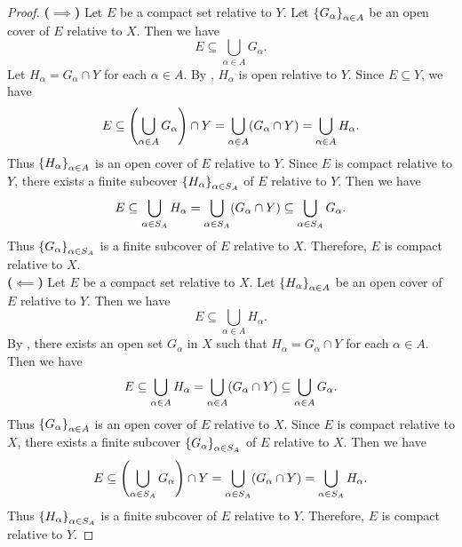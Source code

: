 \begin{proof}
    \textbf{($\implies$)} Let $E$ be a compact set relative to $Y$. Let
    $\set*{G_{\alpha}}_{\alpha \in A}$ be an open cover of $E$ relative to $X$. Then we have
    \[
    E \subseteq \bigcup_{\alpha \in A} G_{\alpha}.
    \]
    Let $H_{\alpha} = G_{\alpha} \cap Y$ for each $\alpha \in A$. By ,
    $H_{\alpha}$ is open relative to $Y$. Since $E \subseteq Y$, we have
    \[
    E \subseteq \paren*{\bigcup_{\alpha \in A} G_{\alpha}} \cap Y =
    \bigcup_{\alpha \in A} \paren*{G_{\alpha} \cap Y} = \bigcup_{\alpha \in A} H_{\alpha}.
    \]
    Thus $\set*{H_{\alpha}}_{\alpha \in A}$ is an open cover of $E$ relative to $Y$. Since $E$ is compact relative
    to $Y$, there exists a finite subcover $\set*{H_{\alpha}}_{\alpha \in S_{A}}$ of $E$ relative to $Y$. Then we have
    \[
    E \subseteq \bigcup_{\alpha \in S_{A}} H_{\alpha} = \bigcup_{\alpha \in S_{A}}
    \paren*{G_{\alpha} \cap Y} \subseteq \bigcup_{\alpha \in S_{A}} G_{\alpha}.
    \]
    Thus $\set*{G_{\alpha}}_{\alpha \in S_{A}}$ is a finite subcover of $E$ relative to $X$.
    Therefore, $E$ is compact relative to $X$.
    \\[6mm]
    \textbf{($\impliedby$)} Let $E$ be a compact set relative to $X$. Let $\set*{H_{\alpha}}_{\alpha \in A}$ be an open
    cover of $E$ relative to $Y$. Then we have
    \[
    E \subseteq \bigcup_{\alpha \in A} H_{\alpha}.
    \]
    By , there exists an open set $G_{\alpha}$ in $X$ such that $H_{\alpha} =
    G_{\alpha} \cap Y$ for each $\alpha \in A$. Then we have
    \[
    E \subseteq \bigcup_{\alpha \in A} H_{\alpha} = \bigcup_{\alpha \in A} \paren*{G_{\alpha} \cap Y}
    \subseteq \bigcup_{\alpha \in A} G_{\alpha}.
    \]
    Thus $\set*{G_{\alpha}}_{\alpha \in A}$ is an open cover of $E$ relative to $X$. Since $E$ is compact relative to $X$,
    there exists a finite subcover $\set*{G_{\alpha}}_{\alpha \in S_{A}}$ of $E$ relative to $X$. Then we have
    \[
    E \subseteq \paren*{\bigcup_{\alpha \in S_{A}} G_{\alpha}} \cap Y = \bigcup_{\alpha \in S_{A}}
    \paren*{G_{\alpha} \cap Y} = \bigcup_{\alpha \in S_{A}} H_{\alpha}.
    \]
    Thus $\set*{H_{\alpha}}_{\alpha \in S_{A}}$ is a finite subcover of $E$ relative to $Y$.
    Therefore, $E$ is compact relative to $Y$.
\end{proof}

\bigskip

